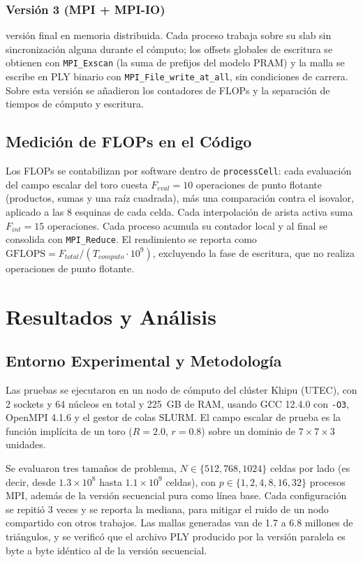 \documentclass[conference]{IEEEtran}
\begin{document}
\subsubsection{Versión 3 (MPI + MPI-IO)} versión final en memoria distribuida. Cada proceso trabaja sobre su slab sin sincronización alguna durante el cómputo; los offsets globales de escritura se obtienen con \texttt{MPI\_Exscan} (la suma de prefijos del modelo PRAM) y la malla se escribe en PLY binario con \texttt{MPI\_File\_write\_at\_all}, sin condiciones de carrera. Sobre esta versión se añadieron los contadores de FLOPs y la separación de tiempos de cómputo y escritura.

\subsection{Medición de FLOPs en el Código}
Los FLOPs se contabilizan por software dentro de \texttt{processCell}: cada evaluación del campo escalar del toro cuesta $F_{eval}=10$ operaciones de punto flotante (productos, sumas y una raíz cuadrada), más una comparación contra el isovalor, aplicado a las 8 esquinas de cada celda. Cada interpolación de arista activa suma $F_{int}=15$ operaciones. Cada proceso acumula su contador local y al final se consolida con \texttt{MPI\_Reduce}. El rendimiento se reporta como $\text{GFLOPS} = F_{total} / (T_{computo} \cdot 10^9)$, excluyendo la fase de escritura, que no realiza operaciones de punto flotante.

\section{Resultados y Análisis}
\label{sec:resultados}

\subsection{Entorno Experimental y Metodología}
Las pruebas se ejecutaron en un nodo de cómputo del clúster Khipu (UTEC), con 2 sockets y 64 núcleos en total y 225~GB de RAM, usando GCC 12.4.0 con \texttt{-O3}, OpenMPI 4.1.6 y el gestor de colas SLURM. El campo escalar de prueba es la función implícita de un toro ($R=2.0$, $r=0.8$) sobre un dominio de $7 \times 7 \times 3$ unidades.

Se evaluaron tres tamaños de problema, $N \in \{512, 768, 1024\}$ celdas por lado (es decir, desde $1.3\times10^8$ hasta $1.1\times10^9$ celdas), con $p \in \{1, 2, 4, 8, 16, 32\}$ procesos MPI, además de la versión secuencial pura como línea base. Cada configuración se repitió 3 veces y se reporta la mediana, para mitigar el ruido de un nodo compartido con otros trabajos. Las mallas generadas van de 1.7 a 6.8 millones de triángulos, y se verificó que el archivo PLY producido por la versión paralela es byte a byte idéntico al de la versión secuencial.
\end{document}
